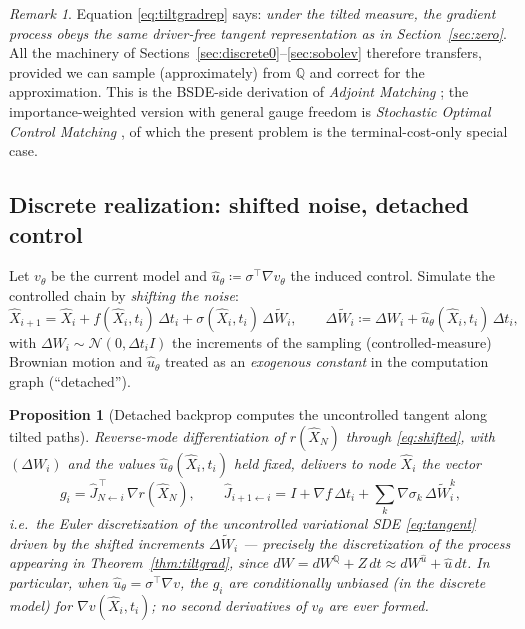 \documentclass[11pt]{article}
\newtheorem{proposition}[theorem]{Proposition}
\theoremstyle{definition}
\theoremstyle{remark}
\newtheorem{remark}[theorem]{Remark}
\newcommand{\Q}{\mathbb{Q}}
\newcommand{\grad}{\nabla}
\newcommand{\uhat}{\hat{u}}
\begin{document}
\begin{remark}
Equation \eqref{eq:tiltgradrep} says: \emph{under the tilted measure, the gradient process
obeys the same driver-free tangent representation as in Section~\ref{sec:zero}}. All the
machinery of Sections~\ref{sec:discrete0}--\ref{sec:sobolev} therefore transfers, provided we
can sample (approximately) from $\Q$ and correct for the approximation. This is the
BSDE-side derivation of \emph{Adjoint Matching} \cite{AdjointMatching}; the
importance-weighted version with general gauge freedom is \emph{Stochastic Optimal Control
Matching} \cite{SOCM}, of which the present problem is the terminal-cost-only special case.
\end{remark}

\subsection{Discrete realization: shifted noise, detached control}

Let $v_\theta$ be the current model and $\uhat_\theta \coloneqq \sigma^\top \grad v_\theta$
the induced control. Simulate the controlled chain by \emph{shifting the noise}:
\begin{equation}\label{eq:shifted}
\widehat X_{i+1} = \widehat X_i + f(\widehat X_i,t_i)\,\Delta t_i
+ \sigma(\widehat X_i,t_i)\,\Delta\widetilde W_i,
\qquad
\Delta\widetilde W_i \coloneqq \Delta W_i + \uhat_\theta(\widehat X_i,t_i)\,\Delta t_i,
\end{equation}
with $\Delta W_i \sim \mathcal N(0,\Delta t_i I)$ the increments of the sampling
(controlled-measure) Brownian motion and $\uhat_\theta$ treated as an \emph{exogenous
constant} in the computation graph (``detached'').

\begin{proposition}[Detached backprop computes the uncontrolled tangent along tilted paths]
\label{prop:detached}
Reverse-mode differentiation of $r(\widehat X_N)$ through \eqref{eq:shifted}, with
$(\Delta W_i)$ and the values $\uhat_\theta(\widehat X_i,t_i)$ held fixed, delivers to node
$\widehat X_i$ the vector
\[
g_i = \widehat J_{N\leftarrow i}^{\,\top}\,\grad r(\widehat X_N),
\qquad
\widehat J_{i+1\leftarrow i} = I + \grad f\,\Delta t_i
+ \sum_k \grad\sigma_k\,\Delta\widetilde W^k_i ,
\]
i.e.\ the Euler discretization of the \emph{uncontrolled} variational SDE \eqref{eq:tangent}
driven by the shifted increments $\Delta\widetilde W_i$ --- precisely the discretization of
the process appearing in Theorem~\ref{thm:tiltgrad}, since
$dW = dW^\Q + Z\,dt \approx dW^{\uhat} + \uhat\,dt$. In particular, when
$\uhat_\theta = \sigma^\top\grad v$, the $g_i$ are conditionally unbiased (in the discrete
model) for $\grad v(\widehat X_i, t_i)$; no second derivatives of $v_\theta$ are ever formed.
\end{proposition}
\end{document}
